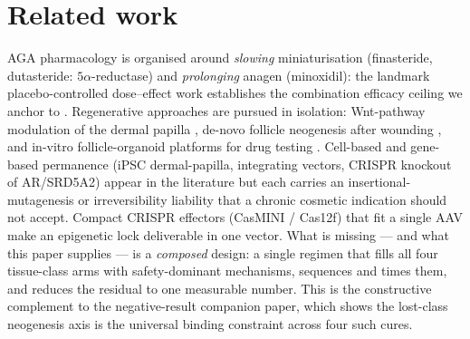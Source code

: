 \documentclass[11pt,a4paper]{article}
\begin{document}
\section{Related work}
\label{sec:related}
AGA pharmacology is organised around \emph{slowing} miniaturisation (finasteride,
dutasteride: $5\alpha$-reductase) and \emph{prolonging} anagen (minoxidil): the
landmark placebo-controlled dose--effect work establishes the combination efficacy
ceiling we anchor to \citep{vanneste2020}. Regenerative approaches are pursued in
isolation: Wnt-pathway modulation of the dermal papilla \citep{hawkshaw2018}, de-novo
follicle neogenesis after wounding \citep{ito2007}, and in-vitro follicle-organoid
platforms for drug testing \citep{kageyama2022,vitroDrugTest2023}. Cell-based and
gene-based permanence (iPSC dermal-papilla, integrating vectors, CRISPR knockout of
AR/SRD5A2) appear in the literature but each carries an insertional-mutagenesis or
irreversibility liability that a chronic cosmetic indication should not accept.
Compact CRISPR effectors (CasMINI / Cas12f) that fit a single AAV \citep{xu2021,wu2010}
make an epigenetic lock deliverable in one vector. What is missing --- and what this
paper supplies --- is a \emph{composed} design: a single regimen that fills all four
tissue-class arms with safety-dominant mechanisms, sequences and times them, and
reduces the residual to one measurable number. This is the constructive complement to
the negative-result companion paper, which shows the lost-class neogenesis axis is the
universal binding constraint across four such cures.
\end{document}
